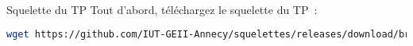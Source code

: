 
\begin{UPSTIManipulation}{Squelette du TP}
	Tout d'abord, téléchargez le squelette du TP :
	\begin{lstlisting}[language=bash,style=console]
wget https://github.com/IUT-GEII-Annecy/squelettes/releases/download/branch-2025/tp3.zip
\end{lstlisting}
\end{UPSTIManipulation}